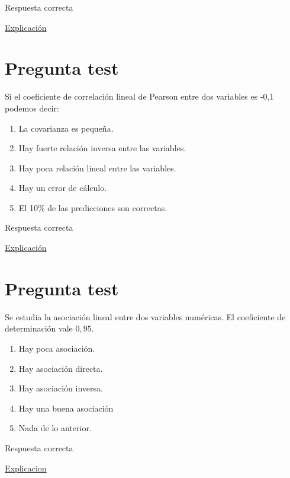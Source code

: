 \documentclass[
]{book}
\providecommand{\tightlist}{%
  \setlength{\itemsep}{0pt}\setlength{\parskip}{0pt}}
\begin{document}
Respuesta correcta

\href{https://blog.minitab.com/es/analisis-de-regresion-como-puedo-interpretar-el-r-cuadrado-y-evaluar-la-bondad-de-ajuste}{Explicación}

\hypertarget{pregunta-test-130}{%
\section{Pregunta test}\label{pregunta-test-130}}

Si el coeficiente de correlación lineal de Pearson entre dos variables es -0,1 podemos decir:

\begin{enumerate}
\def\labelenumi{\alph{enumi})}
\tightlist
\item
  La covarianza es pequeña.
\item
  Hay fuerte relación inversa entre las variables.
\item
  Hay poca relación lineal entre las variables.
\item
  Hay un error de cálculo.
\item
  El 10\% de las predicciones son correctas.
\end{enumerate}

Respuesta correcta

\href{https://1fjmanzano.github.io/bioestadistica/relaci\%C3\%B3n-entre-variables-nume\%CC\%81ricas.html\#coeficiente-de-correlacio\%CC\%81n}{Explicación}

\hypertarget{pregunta-test-131}{%
\section{Pregunta test}\label{pregunta-test-131}}

Se estudia la asociación lineal entre dos variables numéricas. El coeficiente de determinación vale \(0,95\).

\begin{enumerate}
\def\labelenumi{\alph{enumi})}
\tightlist
\item
  Hay poca asociación.
\item
  Hay asociación directa.
\item
  Hay asociación inversa.
\item
  Hay una buena asociación
\item
  Nada de lo anterior.
\end{enumerate}

Respuesta correcta

\href{https://es.wikipedia.org/wiki/Coeficiente_de_determinación}{Explicacion}
\end{document}
